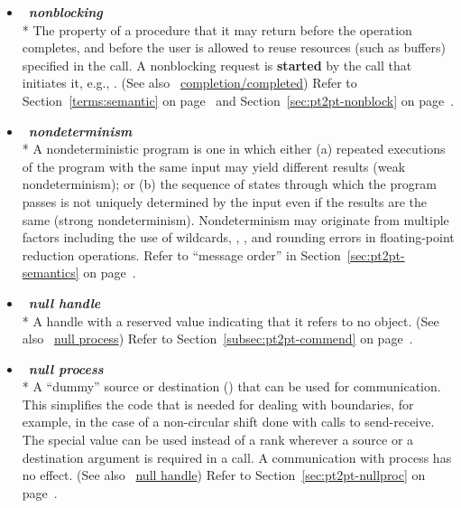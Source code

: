 \begin{itemize}
\label{glossary:nonblocking}
\item  ~\hypertarget{glossary:nonblocking}{\emph{\textbf{nonblocking}}} \\*
The property of a procedure that it may return before the
operation completes, and before the user is allowed to reuse
resources (such as buffers) specified in the call.
A nonblocking request is {\bf started} by the call that initiates it, e.g.,
.
(See also ~\hyperlink{glossary:completion_completed}{completion/completed})
Refer to Section~\ref{terms:semantic} on page~\pageref{terms:semantic} and
Section~\ref{sec:pt2pt-nonblock} on page~\pageref{sec:pt2pt-nonblock}.

\label{glossary:nondeterminism}
\item  ~\hypertarget{glossary:nondeterminism}{\emph{\textbf{nondeterminism}}} \\*
A nondeterministic program is one in which either (a) repeated executions 
of the program with the same input may yield different results (weak 
nondeterminism); or (b) the sequence of states through which the program 
passes is not uniquely determined by the input even if the results are the 
same (strong nondeterminism). Nondeterminism may originate from 
multiple factors including the use of wildcards, 
, , and rounding errors in floating-point 
reduction operations.
Refer to ``message order'' in Section~\ref{sec:pt2pt-semantics} on page~\pageref{sec:pt2pt-semantics}.

\label{glossary:null_handle}
\item  ~\hypertarget{glossary:null_handle}{\emph{\textbf{null handle}}} \\*
A handle with a reserved value indicating that it refers to no object.
(See also ~\hyperlink{glossary:null_process}{null process})
Refer to Section~\ref{subsec:pt2pt-commend} on page~\pageref{subsec:pt2pt-commend}.

\label{glossary:null_process}
\item  ~\hypertarget{glossary:null_process}{\emph{\textbf{null process}}} \\*
A ``dummy'' source or
destination () that can be used
for communication.  This simplifies the code that is needed for dealing with
boundaries, for example, in the case of a non-circular shift done with calls to
send-receive.
The special value  can be used
instead of a rank wherever a
source or a destination argument is required in a call.   A communication
with process  has no effect.
(See also ~\hyperlink{glossary:null_handle}{null handle})
Refer to Section~\ref{sec:pt2pt-nullproc} on page~\pageref{sec:pt2pt-nullproc}.


\end{itemize}
